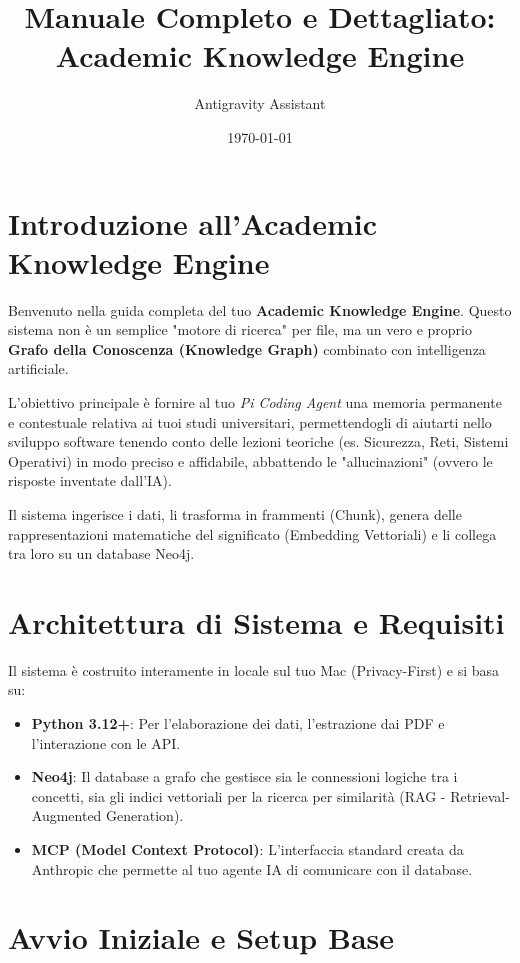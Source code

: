 \documentclass[12pt,a4paper]{article}
\title{\textbf{Manuale Completo e Dettagliato: Academic Knowledge Engine}}
\author{Antigravity Assistant}
\date{\today}
\begin{document}
\maketitle
\tableofcontents
\newpage

\section{Introduzione all'Academic Knowledge Engine}
Benvenuto nella guida completa del tuo \textbf{Academic Knowledge Engine}. Questo sistema non è un semplice "motore di ricerca" per file, ma un vero e proprio \textbf{Grafo della Conoscenza (Knowledge Graph)} combinato con intelligenza artificiale. 

L'obiettivo principale è fornire al tuo \textit{Pi Coding Agent} una memoria permanente e contestuale relativa ai tuoi studi universitari, permettendogli di aiutarti nello sviluppo software tenendo conto delle lezioni teoriche (es. Sicurezza, Reti, Sistemi Operativi) in modo preciso e affidabile, abbattendo le "allucinazioni" (ovvero le risposte inventate dall'IA).

Il sistema ingerisce i dati, li trasforma in frammenti (Chunk), genera delle rappresentazioni matematiche del significato (Embedding Vettoriali) e li collega tra loro su un database Neo4j.

\section{Architettura di Sistema e Requisiti}
Il sistema è costruito interamente in locale sul tuo Mac (Privacy-First) e si basa su:
\begin{itemize}
    \item \textbf{Python 3.12+}: Per l'elaborazione dei dati, l'estrazione dai PDF e l'interazione con le API.
    \item \textbf{Neo4j}: Il database a grafo che gestisce sia le connessioni logiche tra i concetti, sia gli indici vettoriali per la ricerca per similarità (RAG - Retrieval-Augmented Generation).
    \item \textbf{MCP (Model Context Protocol)}: L'interfaccia standard creata da Anthropic che permette al tuo agente IA di comunicare con il database.
\end{itemize}

\section{Avvio Iniziale e Setup Base}
\end{document}
